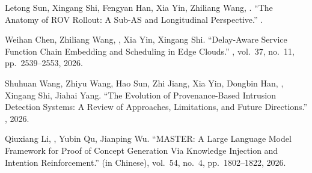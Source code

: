 \documentclass[11pt]{article}
\begin{document}
\begin{publist}
\item Letong Sun, Xingang Shi, Fengyan Han, Xia Yin, Zhiliang Wang, .
``The Anatomy of ROV Rollout: A Sub-AS and Longitudinal Perspective.''
. 
\item Weihan Chen, Zhiliang Wang, , Xia Yin, Xingang Shi.
``Delay-Aware Service Function Chain Embedding and Scheduling in Edge Clouds.''
, vol.~37, no.~11,
pp.~2539--2553, 2026.
\item Shuhuan Wang, Zhiyu Wang, Hao Sun, Zhi Jiang, Xia Yin, Dongbin Han, , Xingang Shi, Jiahai Yang. ``The Evolution of Provenance-Based Intrusion
Detection Systems: A Review of Approaches, Limitations, and Future Directions.''
, 2026.
\item Qiuxiang Li, \corr, Yubin Qu, Jianping Wu. ``MASTER: A Large
Language Model Framework for Proof of Concept Generation Via Knowledge Injection and
Intention Reinforcement.''  (in Chinese), vol.~54,
no.~4, pp.~1802--1822, 2026.
\end{publist}
\end{document}
